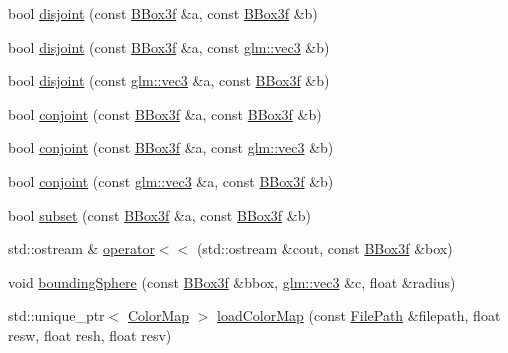 \begin{DoxyCompactItemize}
\item 
bool \hyperlink{namespaceglimac_af945047660f89612aee39af324b57ab1}{disjoint} (const \hyperlink{structglimac_1_1_b_box3f}{B\+Box3f} \&a, const \hyperlink{structglimac_1_1_b_box3f}{B\+Box3f} \&b)
\item 
bool \hyperlink{namespaceglimac_af23f0fc2accb7aa5ab4ba12018cff335}{disjoint} (const \hyperlink{structglimac_1_1_b_box3f}{B\+Box3f} \&a, const \hyperlink{group__core__types_ga1c47e8b3386109bc992b6c48e91b0be7}{glm\+::vec3} \&b)
\item 
bool \hyperlink{namespaceglimac_a505e1fd8b32775d812466a118f7203a0}{disjoint} (const \hyperlink{group__core__types_ga1c47e8b3386109bc992b6c48e91b0be7}{glm\+::vec3} \&a, const \hyperlink{structglimac_1_1_b_box3f}{B\+Box3f} \&b)
\item 
bool \hyperlink{namespaceglimac_aafe905569a9383a2d51f203f89bac2e9}{conjoint} (const \hyperlink{structglimac_1_1_b_box3f}{B\+Box3f} \&a, const \hyperlink{structglimac_1_1_b_box3f}{B\+Box3f} \&b)
\item 
bool \hyperlink{namespaceglimac_a5f57f8def5c4bad5e4ab5c0202fd70f3}{conjoint} (const \hyperlink{structglimac_1_1_b_box3f}{B\+Box3f} \&a, const \hyperlink{group__core__types_ga1c47e8b3386109bc992b6c48e91b0be7}{glm\+::vec3} \&b)
\item 
bool \hyperlink{namespaceglimac_ad0e509e8eac7c698b0bc3c4c5777fb74}{conjoint} (const \hyperlink{group__core__types_ga1c47e8b3386109bc992b6c48e91b0be7}{glm\+::vec3} \&a, const \hyperlink{structglimac_1_1_b_box3f}{B\+Box3f} \&b)
\item 
bool \hyperlink{namespaceglimac_a1ae484262ea1ae8e3333ea994ea1a299}{subset} (const \hyperlink{structglimac_1_1_b_box3f}{B\+Box3f} \&a, const \hyperlink{structglimac_1_1_b_box3f}{B\+Box3f} \&b)
\item 
std\+::ostream \& \hyperlink{namespaceglimac_ac3d5f681d50fe823081cc206220115e6}{operator$<$$<$} (std\+::ostream \&cout, const \hyperlink{structglimac_1_1_b_box3f}{B\+Box3f} \&box)
\item 
void \hyperlink{namespaceglimac_aa47b0f2b0b1ef75335813a7e06f33d0b}{bounding\+Sphere} (const \hyperlink{structglimac_1_1_b_box3f}{B\+Box3f} \&bbox, \hyperlink{group__core__types_ga1c47e8b3386109bc992b6c48e91b0be7}{glm\+::vec3} \&c, float \&radius)
\item 
std\+::unique\+\_\+ptr$<$ \hyperlink{classglimac_1_1_color_map}{Color\+Map} $>$ \hyperlink{namespaceglimac_a2dda30e8ea4df5f5177717f7c8a134c4}{load\+Color\+Map} (const \hyperlink{classglimac_1_1_file_path}{File\+Path} \&filepath, float resw, float resh, float resv)

\end{DoxyCompactItemize}
